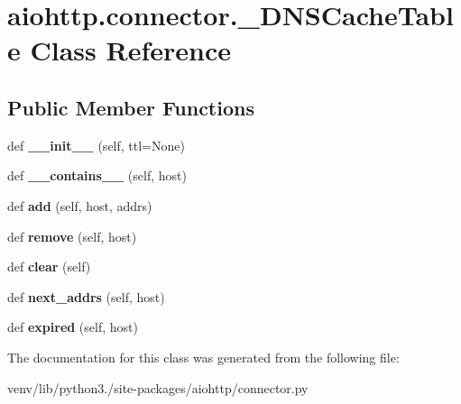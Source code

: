 \hypertarget{classaiohttp_1_1connector_1_1___d_n_s_cache_table}{}\section{aiohttp.\+connector.\+\_\+\+D\+N\+S\+Cache\+Table Class Reference}
\label{classaiohttp_1_1connector_1_1___d_n_s_cache_table}
\subsection*{Public Member Functions}
\begin{DoxyCompactItemize}
\item 
\mbox{\label{classaiohttp_1_1connector_1_1___d_n_s_cache_table_a1ec58172a32dcab53a6ec5eebdce2247}} 
def {\bfseries \+\_\+\+\_\+init\+\_\+\+\_\+} (self, ttl=None)
\item 
\mbox{\label{classaiohttp_1_1connector_1_1___d_n_s_cache_table_a14d3ff67397a5ea3a6e55f9db3dcc7ee}} 
def {\bfseries \+\_\+\+\_\+contains\+\_\+\+\_\+} (self, host)
\item 
\mbox{\label{classaiohttp_1_1connector_1_1___d_n_s_cache_table_af0142c93290966a3c2ba16dff786aae7}} 
def {\bfseries add} (self, host, addrs)
\item 
\mbox{\label{classaiohttp_1_1connector_1_1___d_n_s_cache_table_aa12b92e3c3e7c84707293e21ae37a4f4}} 
def {\bfseries remove} (self, host)
\item 
\mbox{\label{classaiohttp_1_1connector_1_1___d_n_s_cache_table_a577c4d4dbc37bc4dcdca828eaccabab2}} 
def {\bfseries clear} (self)
\item 
\mbox{\label{classaiohttp_1_1connector_1_1___d_n_s_cache_table_a2938a92d8aee833e796bbd7806397037}} 
def {\bfseries next\+\_\+addrs} (self, host)
\item 
\mbox{\label{classaiohttp_1_1connector_1_1___d_n_s_cache_table_af0798cf078ed425f38286e09a7b4817f}} 
def {\bfseries expired} (self, host)
\end{DoxyCompactItemize}


The documentation for this class was generated from the following file\+:\begin{DoxyCompactItemize}
\item 
venv/lib/python3./site-\/packages/aiohttp/connector.\+py\end{DoxyCompactItemize}
